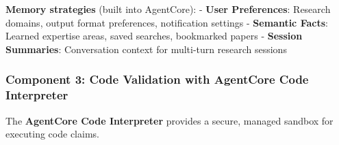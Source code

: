 \begin{Shaded}
\begin{Highlighting}[]
\NormalTok{,}
\OperatorTok{=}
\NormalTok{        )}

     \NormalTok{) }\OperatorTok{{-}\textgreater{}} \NormalTok{:}
\OperatorTok{=} 
\OperatorTok{=}\SpecialCharTok{\{}\SpecialCharTok{\}}\NormalTok{)}
\end{Highlighting}
\end{Shaded}

\textbf{Memory strategies} (built into AgentCore): - \textbf{User
Preferences}: Research domains, output format preferences, notification
settings - \textbf{Semantic Facts}: Learned expertise areas, saved
searches, bookmarked papers - \textbf{Session Summaries}: Conversation
context for multi-turn research sessions

\subsubsection{Component 3: Code Validation with AgentCore Code
Interpreter}\label{component-3-code-validation-with-agentcore-code-interpreter}

The \textbf{AgentCore Code Interpreter} provides a secure, managed
sandbox for executing code claims.


